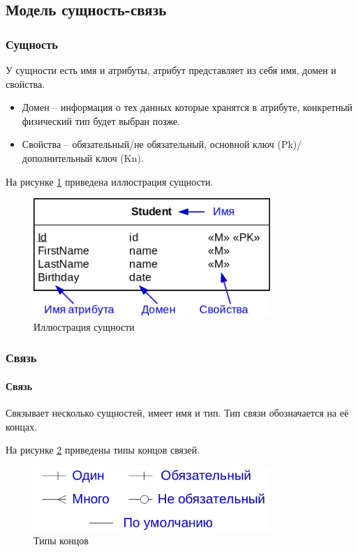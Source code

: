 \subsection{Модель сущность-связь}
\subsubsection{Сущность}

У сущности есть имя и атрибуты, атрибут представляет из себя имя, домен и свойства.
\begin{itemize}
	\item Домен -- информация о тех данных которые хранятся в атрибуте, конкретный физический тип будет
	      выбран позже.
	\item Свойства -- обязательный/не обязательный, основной ключ (Pk)/дополнительный ключ (Kn).
\end{itemize}

На рисунке \ref{entity-ex} приведена иллюстрация сущности.

\begin{figure}[h]
	\centering
	\includegraphics[width=0.8\textwidth]{../assets/kgeorgiy/modelling/ERModel_Entity.svg.png}
	\caption{Иллюстрация сущности}
	\label{entity-ex}
\end{figure}

\subsubsection{Связь}
\paragraph{Связь} Связывает несколько сущностей, имеет имя и тип. Тип связи обозначается на её
концах.

На рисунке \ref{end-types} приведены типы концов связей.

\begin{figure}[h]
	\centering
	\includegraphics[width=0.8\textwidth]{../assets/kgeorgiy/modelling/ERModel_ArrowEnds.svg.png}
	\caption{Типы концов}
	\label{end-types}
\end{figure}

